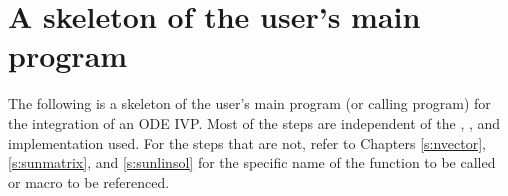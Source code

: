 \section{A skeleton of the user's main program}\label{ss:skeleton_sim}

The following is a skeleton of the user's main program (or calling
program) for the integration of an ODE IVP. Most of the steps are
independent of the {\nvector}, {\sunmatrix}, and {\sunlinsol}
implementation used.  For the steps that are not, refer to Chapters
\ref{s:nvector}, \ref{s:sunmatrix}, and \ref{s:sunlinsol} for the
specific name of the function to be called or macro to be referenced.

